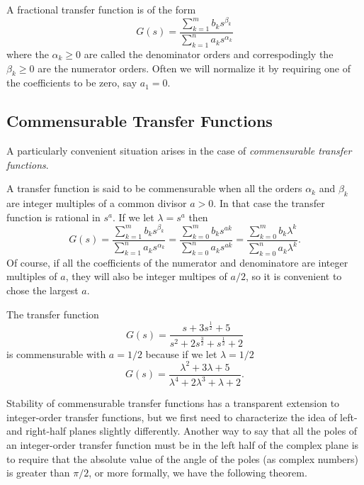 \begin{definition}
  A fractional transfer function is of the form
  \begin{equation*}
    G(s) = \frac{\sum_{k=1}^m b_k s^{\beta_k}}{\sum_{k=1}^n a_k s^{\alpha_k}}
  \end{equation*}
  where the $\alpha_k \geq 0$ are called the denominator orders and correspodingly the $\beta_k \geq 0$ are the numerator orders. 
  Often we will normalize it by requiring one of the coefficients to be zero, say $a_1=0$. 
  \label{def:fractionalxf}
\end{definition}

\subsection{Commensurable Transfer Functions}
A particularly convenient situation arises in the case of \emph{commensurable transfer functions}.

\begin{definition}
  A transfer function is said to be commensurable when all the orders $\alpha_k$ and $\beta_k$ are integer multiples of a common divisor $a > 0$. In that case the transfer function is rational in $s^a$. If we let $\lambda = s^a$ then
  \begin{equation*}
    G(s) = \frac{\sum_{k=1}^m b_k s^{\beta_k}}{\sum_{k=1}^n a_k s^{\alpha_k}} = \frac{\sum_{k=0}^m b_k s^{a k}}{\sum_{k=0}^n a_k s^{a k}} = 
    \frac{\sum_{k=0}^m b_k \lambda^{k}}{\sum_{k=0}^n a_k \lambda^{k}}.
  \end{equation*}
  Of course, if all the coefficients of the numerator and denominatore are integer multiples of $a$, they will also be integer multipes of $a/2$, so it is convenient to chose the largest $a$. 
  \label{def:commensurable}
\end{definition}

\begin{example}
  The transfer function
  \begin{equation*}
    G(s) = \frac{s + 3 s^\frac{1}{2} + 5}{s^2 + 2 s^\frac{3}{2} + s^\frac{1}{2} + 2}
  \end{equation*}
  is commensurable with $a = 1/2$ because if we let $\lambda = 1/2$
  \begin{equation*}
    G(s) = \frac{\lambda^2 + 3 \lambda + 5}{\lambda^4 + 2 \lambda^3 + \lambda + 2}.
  \end{equation*}
\end{example}

Stability of commensurable transfer functions has a transparent extension to integer-order transfer functions, but we first need to characterize the idea of left- and right-half planes slightly differently. Another way to say that all the poles of an integer-order transfer function must be in the left half of the complex plane is to require that the absolute value of the angle of the poles (as complex numbers) is greater than $\pi/2$, or more formally, we have the following theorem.


